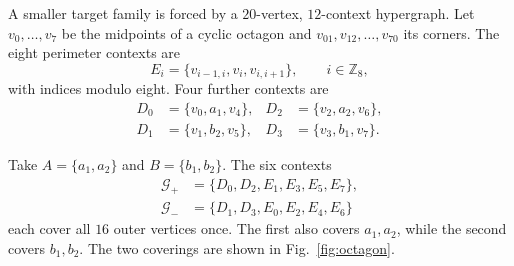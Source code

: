 \documentclass[
  twocolumn,
  aps,
  pra,
  floatfix,
  amsmath,amssymb,
  longbibliography
]{revtex4-2}
\theoremstyle{definition}
\theoremstyle{remark}
\begin{document}
A smaller target family is forced by a $20$-vertex, $12$-context hypergraph.  Let
$v_0,\ldots,v_7$ be the midpoints of a cyclic octagon and
$v_{01},v_{12},\ldots,v_{70}$ its corners. %
The
eight perimeter contexts are
\begin{equation}
 E_i=\{v_{i-1,i},v_i,v_{i,i+1}\},\qquad i\in\mathbb Z_8,
 \label{eq:octagon-perimeter}
\end{equation}
with indices modulo eight. %
Four further contexts are
\begin{align}
 D_0&=\{v_0,a_1,v_4\},&D_2&=\{v_2,a_2,v_6\},\nonumber\\
 D_1&=\{v_1,b_2,v_5\},&D_3&=\{v_3,b_1,v_7\}.
 \label{eq:octagon-inner}
\end{align}

Take $A=\{a_1,a_2\}$ and $B=\{b_1,b_2\}$.  The six contexts
\begin{align}
 \mathcal G_+&=\{D_0,D_2,E_1,E_3,E_5,E_7\},\nonumber\\
 \mathcal G_-&=\{D_1,D_3,E_0,E_2,E_4,E_6\}
 \label{eq:octagon-covers}
\end{align}
each cover all $16$ outer vertices once.  The first also covers $a_1,a_2$,
while the second covers $b_1,b_2$.  The two coverings are shown in
Fig.~\ref{fig:octagon}.
\end{document}
